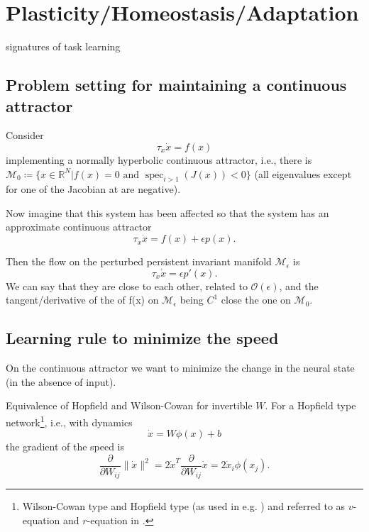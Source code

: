 \documentclass{article}
\theoremstyle{definition} \newtheorem{definition}{Definition}
\theoremstyle{remark} \newtheorem{remark}{Remark}
\newcommand{\reals}{\mathbb{R}}
\newcommand{\manifold}{\mathcal{M}}
\newcommand{\spec}{\operatorname{spec}}
\newcounter{ct}
\begin{document}
\section{Plasticity/Homeostasis/Adaptation}
\citep{martin2000plasticity}
\citep{takeuchi2014plasticity}

\cite{bell2024discovering} \citep{shervani2023meta}
\citep{chadwick2023learning}

signatures of task learning \citep{gurnani2023task}

\subsection{Problem setting for maintaining a continuous attractor}

Consider 
\begin{equation}\label{eq:ode}
\tau_x\dot x = f(x) 
\end{equation}
implementing a normally hyperbolic continuous attractor, i.e., there is $\manifold_0\coloneqq \{x \in \reals^N | f(x) = 0 \text{ and } \spec_{i>1}(J(x)) <0\}$  (all eigenvalues except for one of the Jacobian at are negative). 

Now imagine that this system has been affected so that the system has an approximate continuous attractor
\begin{equation}\label{eq:ode_pert}
\tau_x\dot x = f(x)  + \epsilon p(x).
\end{equation}

Then the flow on the perturbed persistent invariant manifold $\manifold_\epsilon$ is
\begin{equation}\label{eq:ode_pert}
\tau_x\dot x = \epsilon p'(x).
\end{equation}
We can say that they are close to each other, related to $\mathcal{O}(\epsilon)$, and the tangent/derivative of the of f(x) on $\manifold_\epsilon$ being $C^1$ close the one on $\manifold_0$.




\subsection{Learning rule to minimize the speed}%
On the continuous attractor we want to minimize the change in the neural state (in the absence of input).

Equivalence of Hopfield and Wilson-Cowan\citep{miller2012mathematical} for invertible $W$.
For a Hopfield type network\footnote{Wilson-Cowan type and Hopfield type (as used in e.g. \citep{gort2024emergence}) and referred to as $v$-equation and $r$-equation in \citep{miller2012mathematical}.}, i.e., with dynamics 
\begin{equation}\label{sec:hopfieldode}
\dot x = W\phi(x) + b
\end{equation}
 the gradient of the speed is
\begin{equation}
\frac{\partial}{\partial W_{ij}}\|\dot x \|^2 = 2 \dot x^T \frac{\partial}{\partial W_{ij}}\dot x = 2 \dot x_i\phi(x_j).
\end{equation}
\end{document}
